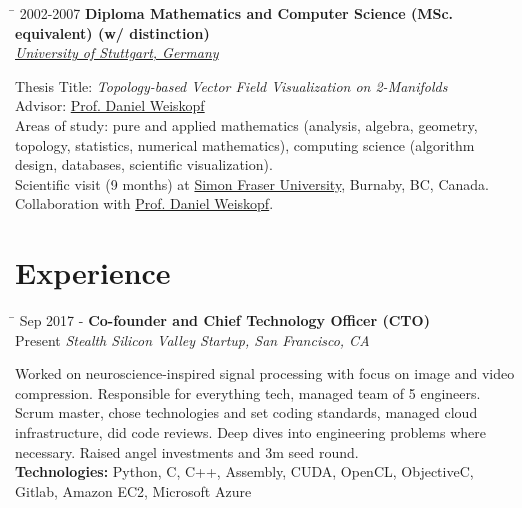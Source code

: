 \documentclass[10pt]{article} %
\newlength{\smallertextwidth}
\newcommand{\education}[4]{
\begin{tabbing}%
\hspace{2.2cm}\=\kill%
{#1} \> \textbf{#2}\\
\>\+ \textit{#3}\\[3pt]
\begin{minipage}{\smallertextwidth}
\vspace{2mm}
#4
\end{minipage}
\end{tabbing}
\vspace{2mm}
}
\newcommand{\job}[5]{
\begin{tabbing}
\hspace{2.2cm} \= \kill
{#1} \> \textbf{#3}\\
{#2} \>\+ \textit{#4}\\[3pt]
\begin{minipage}{\smallertextwidth}
\vspace{2mm}
#5
\end{minipage}
\end{tabbing}
\vspace{2mm}
}
\begin{document}
\education
{2002-2007}
{Diploma Mathematics and Computer Science (MSc. equivalent) \textmd{(w/ distinction)}}
{\href{https://uni-stuttgart.de}{University of Stuttgart, Germany}}
{
Thesis Title: \textit{Topology-based Vector Field Visualization on 2-Manifolds}\\
Advisor: \href{https://www.vis.uni-stuttgart.de/institut/mitarbeiter/Weiskopf-00001/}{Prof. Daniel Weiskopf}\\[5pt]
%
Areas of study: pure and applied mathematics (analysis, algebra, geometry, topology, statistics, numerical mathematics), 
computing science (algorithm design, databases, scientific visualization).\\
Scientific visit (9 months) at \href{https://www.sfu.ca/}{Simon Fraser University}, Burnaby, BC, Canada.
Collaboration with \href{https://www.vis.uni-stuttgart.de/institut/mitarbeiter/Weiskopf-00001/}{Prof. Daniel Weiskopf}.
}



\section{Experience}

\job
{Sep 2017 -}{Present}
{Co-founder and Chief Technology Officer (CTO)}
{Stealth Silicon Valley Startup\textup{, San Francisco, CA}}
{
Worked on neuroscience-inspired signal processing with focus on image and video compression. 
Responsible for everything tech, managed team of 5 engineers. Scrum master, chose technologies and
set coding standards, managed cloud infrastructure, did code reviews. Deep dives into engineering
problems where necessary. Raised angel investments and 3m seed round.\\[5pt]
\textbf{Technologies:} Python, C, C++, Assembly, CUDA, OpenCL, ObjectiveC, Gitlab, Amazon EC2, Microsoft Azure
}
\end{document}
